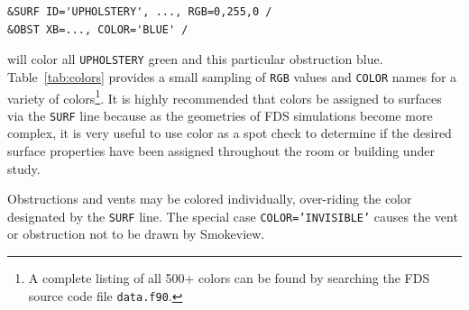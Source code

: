 \documentclass[11pt]{book}
\newcommand{\ct}{\tt\small}
\begin{document}
\footnotesize
\begin{verbatim}
&SURF ID='UPHOLSTERY', ..., RGB=0,255,0 /
&OBST XB=..., COLOR='BLUE' /
\end{verbatim}
\normalsize

\noindent
will color all {\ct UPHOLSTERY} green and this particular obstruction blue. Table~\ref{tab:colors} provides a small sampling of {\ct RGB} values and {\ct COLOR} names
for a variety of colors\footnote{A complete listing of all 500+ colors can be found by searching the FDS source code file {\ct data.f90}.}.
It is highly recommended that colors be assigned to surfaces via the {\ct SURF} line because as
the geometries of FDS simulations become more complex, it is very useful
to use color as a spot check to determine if the desired surface properties have been assigned throughout the room or building under study.

Obstructions and vents may be colored individually, over-riding the color designated by the {\ct SURF} line. The special case {\ct COLOR='INVISIBLE'} causes the vent or obstruction not to be drawn by Smokeview.
\end{document}
